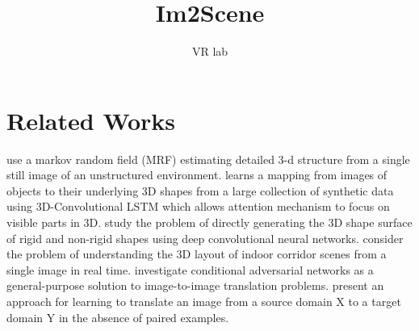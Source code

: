 \documentclass{article}
\title{Im2Scene}
\author{VR lab}
\affil{State Key Laboratory of Virtual Reality Technology and Systems, BUAA University}
\begin{document}
\maketitle

\section{Related Works}

\cite{Saxena2009Make3D} use a markov random field (MRF) estimating detailed 3-d structure from a single still image of an unstructured environment. \cite{choy20163d} learns a mapping from images of objects to their underlying 3D shapes from a large collection of synthetic data using 3D-Convolutional LSTM which allows attention mechanism to focus on visible parts in 3D. \cite{Sinha2017SurfNet} study the problem of directly generating the 3D shape surface of rigid and non-rigid shapes using deep convolutional neural networks. \cite{Yang2016Real}  consider the problem of understanding the 3D layout of indoor corridor scenes from a single image in real time. \cite{Isola2016Image} investigate conditional adversarial networks as a general-purpose solution to image-to-image translation problems. \cite{Zhu2017Unpaired} present an approach for learning to translate an image from a source domain X to a target domain Y in the absence of paired examples. 






\end{document}
